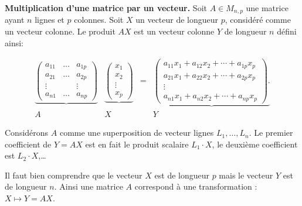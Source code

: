 \documentclass[11pt,class=report,crop=false]{standalone}
\begin{document}


\textbf{Multiplication d'une matrice par un vecteur.}
Soit $A \in M_{n,p}$ une matrice ayant $n$ lignes et $p$ colonnes.
Soit $X$ un vecteur de longueur $p$, considéré comme un vecteur colonne.
Le produit $AX$ est un vecteur colonne $Y$ de longueur $n$ défini ainsi:

\begin{equation*}
	\begin{array}{cccc}
		\underbrace{
			\left(
			\begin{array}{ccc}
				a_{11} & \dots & a_{1p}\\
				a_{21} & \dots & a_{2p}\\
				\vdots &&\vdots\\
				a_{n1} &\dots & a_{np}
			\end{array}
			\right)
		}
		&
		\underbrace{
			\left(
			\begin{array}{c}
				x_1\\
				x_2\\
				\vdots\\
				x_p
			\end{array}
			\right)
		}
		& = &
		\underbrace{
			\left(
			\begin{array}{c}
				a_{11}x_1+a_{12}x_2+\cdots + a_{1p}x_p \\
				a_{21}x_1+a_{22}x_2+\cdots + a_{2p}x_p \\
				\vdots\\
				a_{n1}x_1+a_{n2}x_2+\cdots + a_{np}x_p 
			\end{array}
			\right).
		}
		\\
		A & X & &Y
\end{array}\end{equation*}

Considérons $A$ comme une superposition de vecteur lignes $L_1,\ldots,L_n$.
Le premier coefficient de $Y=AX$ est en fait le produit scalaire $L_1 \cdot X$, le deuxième coefficient est $L_2 \cdot X$,\ldots{}



Il faut bien comprendre que le vecteur $X$ est de longueur $p$ mais le vecteur $Y$ est de longueur $n$.
Ainsi une matrice $A$ correspond à une transformation : $X \mapsto Y = AX$.
\end{document}
